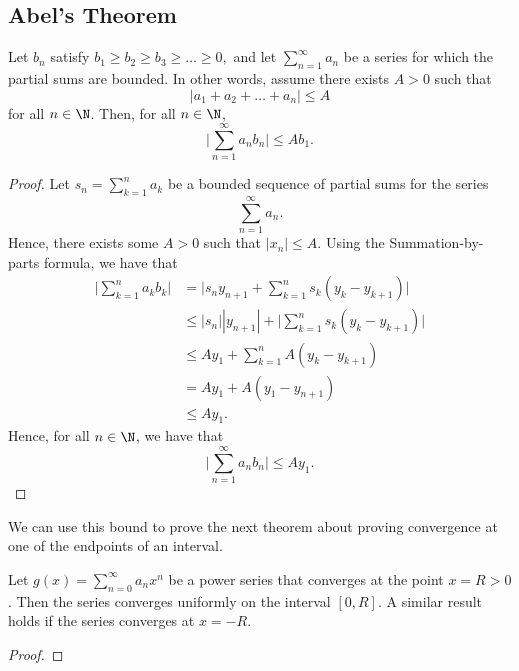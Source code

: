 \subsection{Abel's Theorem}

\begin{tcolorbox}
    \begin{lem}
    Let \( b_n  \) satisfy \( b_1 \geq b_2 \geq b_3 \geq \dots \geq 0,  \) and  let \( \sum_{ n=1 }^{ \infty  } a_n  \) be a series for which the partial sums are bounded. In other words, assume there exists \( A > 0  \) such that 
    \[  | a_1 + a_2 + \dots + a_n  |  \leq A  \] for all \( n \in \N  \). Then, for all \( n \in \N  \), 
    \[  \Big| \sum_{ n=1 }^{ \infty  } a_n b_n  \Big|  \leq Ab_1. \]
    \end{lem}
\end{tcolorbox}

\begin{proof}
Let \( s_n = \sum_{ k=1 }^{ n  } a_k  \) be a bounded sequence of partial sums for the series 
\[  \sum_{ n=1  }^{  \infty  } a_n.  \] Hence, there exists some \( A > 0  \) such that \( | x_n  | \leq A  \). Using the Summation-by-parts formula, we have that 
\begin{align*}
    \Big| \sum_{ k=1 }^{ n } a_k b_k  \Big| &= \Big| s_n y_{n+1} + \sum_{ k=1 }^{ n } s_k (y_k - y_{k+1}) \Big|  \\
                                            &\leq | s_n | | y_{n+1} | + \Big| \sum_{ k=1 }^{ n } s_k (y_k - y_{k+1}) \Big| \\
                                            &\leq Ay_1 + \sum_{ k=1 }^{ n } A (y_k - y_{k+1}) \\
                                            &= Ay_1 + A(y_1 - y_{n+1}) \\
                                            &\leq Ay_1.
\end{align*}
Hence, for all \( n \in \N  \), we have that 
\[  \Big| \sum_{ n=1 }^{ \infty  } a_n b_n  \Big|  \leq Ay_1. \]
\end{proof}

We can use this bound to prove the next theorem about proving convergence at one of the endpoints of an interval.

\begin{tcolorbox}
    \begin{thm}
        Let \( g(x) = \sum_{ n=0  }^{  \infty  } a_n x^n  \) be a power series that converges at the point \( x = R > 0  \). Then the series converges uniformly on the interval \( [0,R] \). A similar result holds if the series converges at \( x = -R  \).
    \end{thm}
\end{tcolorbox}

\begin{proof}

\end{proof}






